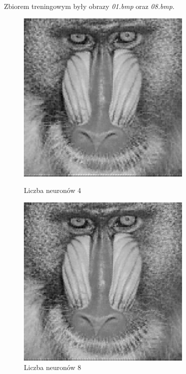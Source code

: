 \documentclass[../EDI_Task4_Karwowski_Kowalewski.tex]{subfiles}
\begin{document}
 {

    Zbiorem treningowym były obrazy \textit{01.bmp} oraz \textit{08.bmp}.
    \begin{figure}[!htbp]
        \begin{minipage}[c]{0.49\linewidth}
            \centering
            \includegraphics[width=0.75\textwidth]{img/results_1/4/compressed_02.png}
            \caption{Liczba neuronów 4}
        \end{minipage}\hfill
        \begin{minipage}[c]{0.49\linewidth}
            \centering
            \includegraphics[width=0.75\textwidth]{img/results_1/8/compressed_02.png}
            \caption{Liczba neuronów 8}
        \end{minipage}
    \end{figure}

}
\end{document}
